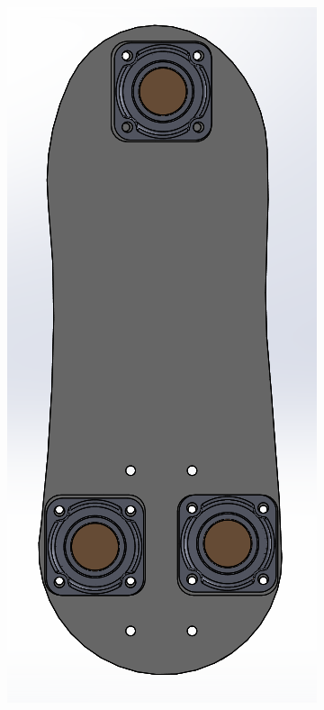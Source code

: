 \begin{figure}[!ht]
  \centering
  \begin{subfigure}[b]{0.2\linewidth}
    \includegraphics[width=\linewidth]{chapter4/images/foot+FSR.PNG}

\end{subfigure}
\end{figure}
